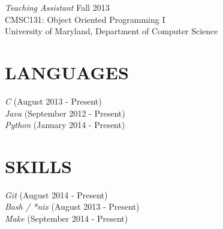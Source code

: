 \documentclass[margin]{res}
\begin{document}
\begin{resume}
	{\sl Teaching Assistant } \hfill Fall 2013 \\
	CMSC131: Object Oriented Programming I \\
	University of Maryland, Department of Computer Science \\ 
	
\section{LANGUAGES} {\sl C }\hfill (August 2013 - Present) \\
	{\sl Java } \hfill (September 2012 - Present) \\
	{\sl Python } \hfill (January 2014 - Present) \\
	
\section{SKILLS} {\sl Git } \hfill (August 2014 - Present) \\
	{\sl Bash / *nix } \hfill (August 2013 - Present) \\
	{\sl Make } \hfill (September 2014 - Present)

\end{resume}
\end{document}
